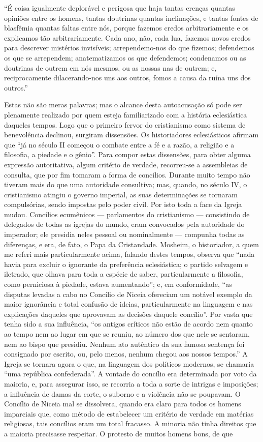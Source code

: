 \documentclass[11pt,a5paper,twoside,openany]{book}
\begin{document}
“É coisa igualmente deplorável e perigosa que haja tantas crenças quantas opiniões entre os homens, tantas doutrinas quantas inclinações, e tantas fontes de blasfêmia quantas faltas entre nós, porque fazemos credos arbitrariamente e os explicamos tão arbitrariamente. Cada ano, não, cada lua, fazemos novos credos para descrever mistérios invisíveis; arrependemo-nos do que fizemos; defendemos os que se arrependem; anatematizamos os que defendemos; condenamos ou as doutrinas de outrem em nós mesmos, ou as nossas nas de outrem; e, reciprocamente dilacerando-nos uns aos outros, fomos a causa da ruína uns dos outros.”

Estas não são meras palavras; mas o alcance desta autoacusação só pode ser plenamente realizado por quem esteja familiarizado com a história eclesiástica daqueles tempos. Logo que o primeiro fervor do cristianismo como sistema de benevolência declinou, surgiram dissensões. Os historiadores eclesiásticos afirmam que “já no século II começou o combate entre a fé e a razão, a religião e a filosofia, a piedade e o gênio”. Para compor estas dissensões, para obter alguma expressão autoritativa, algum critério de verdade, recorreu-se a assembleias de consulta, que por fim tomaram a forma de concílios. Durante muito tempo não tiveram mais do que uma autoridade consultiva; mas, quando, no século IV, o cristianismo atingiu o governo imperial, as suas determinações se tornaram compulsórias, sendo impostas pelo poder civil. Por isto toda a face da Igreja mudou. Concílios ecumênicos — parlamentos do cristianismo — consistindo de delegados de todas as igrejas do mundo, eram convocados pela autoridade do imperador; ele presidia neles pessoal ou nominalmente — compunha todas as diferenças, e era, de fato, o Papa da Cristandade. Mosheim, o historiador, a quem me referi mais particularmente acima, falando destes tempos, observa que “nada havia para excluir o ignorante da preferência eclesiástica; o partido selvagem e iletrado, que olhava para toda a espécie de saber, particularmente a filosofia, como perniciosa à piedade, estava aumentando”; e, em conformidade, “as disputas levadas a cabo no Concílio de Niceia ofereciam um notável exemplo da maior ignorância e total confusão de ideias, particularmente na linguagem e nas explicações daqueles que aprovavam as decisões daquele concílio”. Por vasta que tenha sido a sua influência, “os antigos críticos não estão de acordo nem quanto ao tempo nem ao lugar em que se reuniu, ao número dos que nele se sentaram, nem ao bispo que presidiu. Nenhum ato autêntico da sua famosa sentença foi consignado por escrito, ou, pelo menos, nenhum chegou aos nossos tempos.” A Igreja se tornara agora o que, na linguagem dos políticos modernos, se chamaria “uma república confederada”. A vontade do concílio era determinada por voto da maioria, e, para assegurar isso, se recorria a toda a sorte de intrigas e imposições; a influência de damas da corte, o suborno e a violência não se poupavam. O Concílio de Niceia mal se dissolvera, quando era claro para todos os homens imparciais que, como método de estabelecer um critério de verdade em matérias religiosas, tais concílios eram um total fracasso. A minoria não tinha direitos que a maioria precisasse respeitar. O protesto de muitos homens bons, de que 
\end{document}
